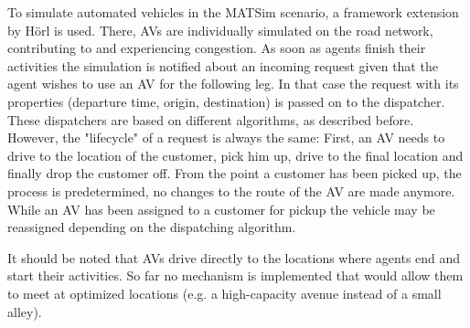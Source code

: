 To simulate automated vehicles in the MATSim scenario, a framework extension by Hörl \cite{horl_abmtrans17} is used. There, AVs are individually simulated on the road network, contributing to and experiencing congestion. As soon as agents finish their activities the simulation is notified about an incoming request given that the agent wishes to use an AV for the following leg. In that case the request with its properties (departure time, origin, destination) is passed on to the dispatcher. These dispatchers are based on different algorithms, as described before. However, the "lifecycle" of a request is always the same: First, an AV needs to drive to the location of the customer, pick him up, drive to the final location and finally drop the customer off. From the point a customer has been picked up, the process is predetermined, no changes to the route of the AV are made anymore. While an AV has been assigned to a customer for pickup the vehicle may be reassigned depending on the dispatching algorithm.

It should be noted that AVs drive directly to the locations where agents end and start their activities. So far no mechanism is implemented that would allow them to meet at optimized locations (e.g. a high-capacity avenue instead of a small alley).
